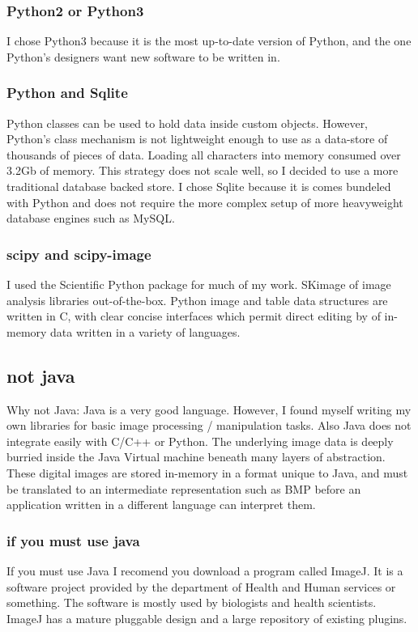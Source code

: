 \subsubsection{Python2 or Python3}
I chose Python3 because it is the most up-to-date version of Python, and the one Python's designers want new software to be written in.
\subsubsection{Python and Sqlite}
Python classes can be used to hold data inside custom objects.  However, Python's class mechanism is not lightweight enough to use as a data-store of thousands of pieces of data.  Loading all characters into memory consumed over 3.2Gb of memory.  This strategy does not scale well, so I decided to use a more traditional database backed store.  I chose Sqlite because it is comes bundeled with Python and does not require the more complex setup of more heavyweight database engines such as MySQL.

\subsubsection{scipy and scipy-image}
I used the Scientific Python package for much of my work. SKimage of image analysis libraries out-of-the-box.  Python image and table data structures are written in C, with clear concise interfaces which permit direct editing by of in-memory data written in a variety of languages.

\subsection{not java}
Why not Java:  Java is a very good language. However, I found myself writing my own libraries for basic image processing / manipulation tasks.  Also Java does not integrate easily with C/C++ or Python.  The underlying image data is deeply burried inside the Java Virtual machine beneath many layers of abstraction. These digital images are stored in-memory in a format unique to Java, and must be translated to an intermediate representation such as BMP before an application written in a different language can interpret them.

\subsubsection{if you must use java}
If you must use Java I recomend you download a program called ImageJ. It is a software project provided by the department of Health and Human services or something.  The software is mostly used by biologists and health scientists. ImageJ has a mature pluggable design and a large repository of existing plugins.

